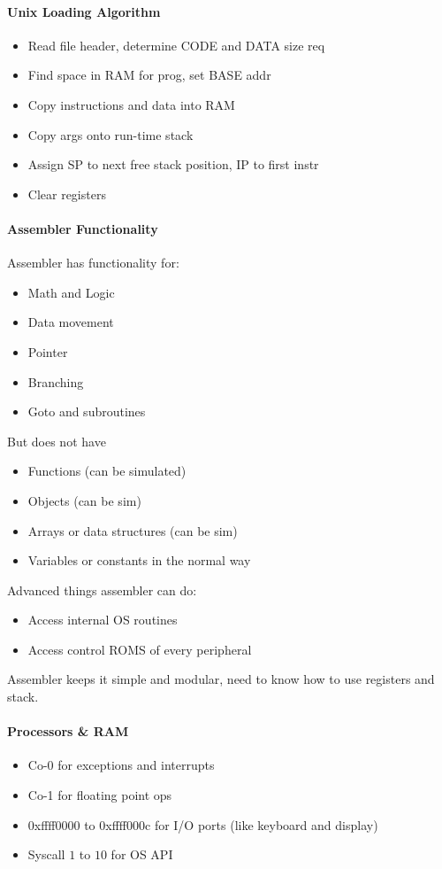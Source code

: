 \documentclass[12 pt]{article}
\begin{document}
\paragraph{Unix Loading Algorithm}
\begin{itemize}
\item Read file header, determine CODE and DATA size req
\item Find space in RAM for prog, set BASE addr
\item Copy instructions and data into RAM
\item Copy args onto run-time stack
\item Assign SP to next free stack position, IP to first instr
\item Clear registers
\end{itemize}
\paragraph{Assembler Functionality}
Assembler has functionality for:
\begin{itemize}
\item Math and Logic
\item Data movement
\item Pointer
\item Branching
\item Goto and subroutines
\end{itemize}
But does not have
\begin{itemize}
\item Functions (can be simulated)
\item Objects (can be sim)
\item Arrays or data structures (can be sim)
\item Variables or constants in the normal way
\end{itemize}
Advanced things assembler can do:
\begin{itemize}
\item Access internal OS routines
\item Access control ROMS of every peripheral
\end{itemize}
Assembler keeps it simple and modular, need to know how to use registers and stack.
\paragraph{Processors \& RAM}
\begin{itemize}
\item Co-0 for exceptions and interrupts
\item Co-1 for floating point ops
\item 0xffff0000 to 0xffff000c for I/O ports (like keyboard and display)
\item Syscall $1$ to $10$ for OS API
\end{itemize}
\end{document}
